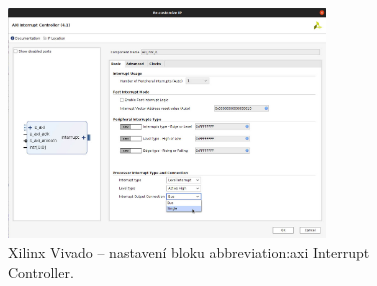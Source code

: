 \documentclass[a4paper, twoside, 11pt]{article}
\begin{document}
				\begin{figure}[htbp!]
					\centering
					\includegraphics[width=0.75\textwidth]{src/png/kr26-xilinx-vivado-flow/kr26-xilix-vivado-flow-10.jpg}
					\caption{Xilinx Vivado – nastavení bloku \gls{abbreviation:axi} Interrupt Controller.}
					\label{fig:kr26-xilix-vivado-flow-10}
				\end{figure}
\end{document}
